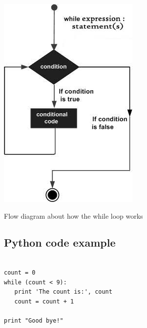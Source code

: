 \begin{marginfigure}
  \includegraphics[width=\linewidth]{whileloop.jpeg}
  \caption{Flow diagram about how the while loop works}
  \label{fig:marginfig}
\end{marginfigure}

\vspace{0.5cm}
\subsection{Python code example}
\begin{framed}
\begin{verbatim}

count = 0
while (count < 9):
   print 'The count is:', count
   count = count + 1

print "Good bye!"

\end{verbatim}
\end{framed}

